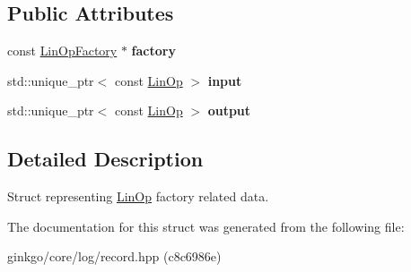 \subsection*{Public Attributes}
\begin{DoxyCompactItemize}
\item 
\mbox{\label{structgko_1_1log_1_1linop__factory__data_abd892acbefd3c147e384a3dcc897f6ac}} 
const \hyperlink{classgko_1_1LinOpFactory}{Lin\+Op\+Factory} $\ast$ {\bfseries factory}
\item 
\mbox{\label{structgko_1_1log_1_1linop__factory__data_a6ea6595461c7157fa729c91239147f14}} 
std\+::unique\+\_\+ptr$<$ const \hyperlink{classgko_1_1LinOp}{Lin\+Op} $>$ {\bfseries input}
\item 
\mbox{\label{structgko_1_1log_1_1linop__factory__data_a5056dcdd50e3f842c2069959ca85b1c3}} 
std\+::unique\+\_\+ptr$<$ const \hyperlink{classgko_1_1LinOp}{Lin\+Op} $>$ {\bfseries output}
\end{DoxyCompactItemize}


\subsection{Detailed Description}
Struct representing \hyperlink{classgko_1_1LinOp}{Lin\+Op} factory related data. 

The documentation for this struct was generated from the following file\+:\begin{DoxyCompactItemize}
\item 
ginkgo/core/log/record.\+hpp (c8c6986e)\end{DoxyCompactItemize}
